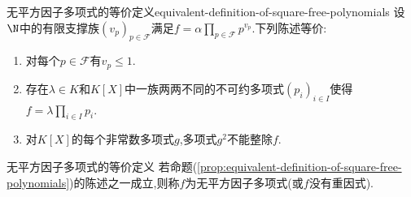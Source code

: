 \begin{proposition}{无平方因子多项式的等价定义}{equivalent-definition-of-square-free-polynomials}
	设$\N$中的有限支撑族$\left(v_{p}\right)_{p\in\mathscr{F}}$满足$f=\alpha\prod\limits_{p\in\mathscr{F}}p^{v_{p}}$.下列陈述等价:
	\begin{enumerate}
		\item 对每个$p\in\mathscr{F}$有$v_{p}\leq 1$.
		\item 存在$\lambda\in K$和$K\left[X\right]$中一族两两不同的不可约多项式$\left(p_{i}\right)_{i\in I}$使得$f=\lambda\prod\limits_{i\in I}p_{i}$.
		\item 对$K\left[X\right]$的每个非常数多项式$g$,多项式$g^{2}$不能整除$f$.
	\end{enumerate}
\end{proposition}

\begin{definition}{无平方因子多项式的等价定义}{}
	若命题(\cref{prop:equivalent-definition-of-square-free-polynomials})的陈述之一成立,则称$f$为无平方因子多项式(或$f$没有重因式).
\end{definition}









































